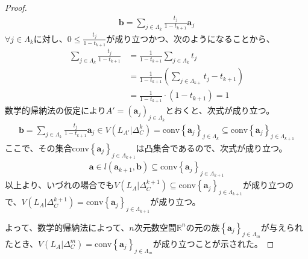 \documentclass[dvipdfmx]{jsarticle}
\begin{document}
\begin{proof}
\begin{align*}
\mathbf{b} = \sum_{j \in \varLambda_{k}} {\frac{t_{j}}{1 - t_{k + 1}}\mathbf{a}_{j}}
\end{align*}
$\forall j \in \varLambda_{k}$に対し、$0 \leq \frac{t_{j}}{1 - t_{k + 1}}$が成り立つかつ、次のようになることから、
\begin{align*}
\sum_{j \in \varLambda_{k}} \frac{t_{j}}{1 - t_{k + 1}} &= \frac{1}{1 - t_{k + 1}}\sum_{j \in \varLambda_{k}} t_{j}\\
&= \frac{1}{1 - t_{k + 1}}\left( \sum_{j \in \varLambda_{k +}} t_{j} - t_{k + 1} \right)\\
&= \frac{1}{1 - t_{k + 1}} \cdot \left( 1 - t_{k + 1} \right) = 1
\end{align*}
数学的帰納法の仮定により$A' = \left( \mathbf{a}_{j} \right)_{j \in \varLambda_{k}}$とおくと、次式が成り立つ。
\begin{align*}
\mathbf{b} = \sum_{j \in \varLambda_{k}} {\frac{t_{j}}{1 - t_{k + 1}}\mathbf{a}_{j}} \in V\left( L_{A'}|\varDelta_{C}^{k} \right) = \mathrm{conv}\left\{ \mathbf{a}_{j} \right\}_{j \in \varLambda_{k}} \subseteq \mathrm{conv}\left\{ \mathbf{a}_{j} \right\}_{j \in \varLambda_{k + 1}}
\end{align*}
ここで、その集合$\mathrm{conv}\left\{ \mathbf{a}_{j} \right\}_{j \in \varLambda_{k + 1}}$は凸集合であるので、次式が成り立つ。
\begin{align*}
\mathbf{a} \in l\left( \mathbf{a}_{k + 1},\mathbf{b} \right) \subseteq \mathrm{conv}\left\{ \mathbf{a}_{j} \right\}_{j \in \varLambda_{k + 1}}
\end{align*}
以上より、いづれの場合でも$V\left( L_{A}|\varDelta_{C}^{k + 1} \right) \subseteq \mathrm{conv}\left\{ \mathbf{a}_{j} \right\}_{j \in \varLambda_{k + 1}}$が成り立つので、$V\left( L_{A}|\varDelta_{C}^{k + 1} \right) = \mathrm{conv}\left\{ \mathbf{a}_{j} \right\}_{j \in \varLambda_{k + 1}}$が成り立つ。\par
よって、数学的帰納法によって、$n$次元数空間$\mathbb{R}^{n}$の元の族$\left\{ \mathbf{a}_{j} \right\}_{j \in \varLambda_{m}}$が与えられたとき、$V\left( L_{A}|\varDelta_{C}^{m} \right) = \mathrm{conv}\left\{ \mathbf{a}_{j} \right\}_{j \in \varLambda_{m}}$が成り立つことが示された。
\end{proof}
\end{document}
